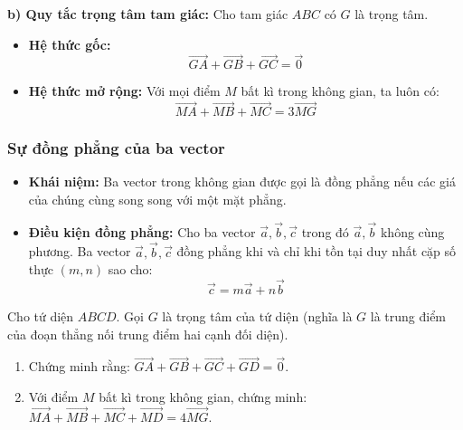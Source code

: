 \documentclass[12pt]{article}
\begin{document}
	
	\noindent \textbf{b) Quy tắc trọng tâm tam giác:}
	Cho tam giác $ABC$ có $G$ là trọng tâm.
	\begin{itemize}
		\item \textbf{Hệ thức gốc:}
		$$ \overrightarrow{GA} + \overrightarrow{GB} + \overrightarrow{GC} = \vec{0} $$
		\item \textbf{Hệ thức mở rộng:} Với mọi điểm $M$ bất kì trong không gian, ta luôn có:
		$$ \overrightarrow{MA} + \overrightarrow{MB} + \overrightarrow{MC} = 3\overrightarrow{MG} $$
	\end{itemize}
	
	\subsubsection{Sự đồng phẳng của ba vector}
	\begin{itemize}
		\item \textbf{Khái niệm:} Ba vector trong không gian được gọi là đồng phẳng nếu các giá của chúng cùng song song với một mặt phẳng.
		\item \textbf{Điều kiện đồng phẳng:} Cho ba vector $\vec{a}, \vec{b}, \vec{c}$ trong đó $\vec{a}, \vec{b}$ không cùng phương. Ba vector $\vec{a}, \vec{b}, \vec{c}$ đồng phẳng khi và chỉ khi tồn tại duy nhất cặp số thực $(m, n)$ sao cho:
		$$ \vec{c} = m\vec{a} + n\vec{b} $$
	\end{itemize}
	
	\begin{vidu}[3]
		Cho tứ diện $ABCD$. Gọi $G$ là trọng tâm của tứ diện (nghĩa là $G$ là trung điểm của đoạn thẳng nối trung điểm hai cạnh đối diện). 
		\begin{enumerate}[label=\alph*)]
			\item Chứng minh rằng: $\overrightarrow{GA} + \overrightarrow{GB} + \overrightarrow{GC} + \overrightarrow{GD} = \vec{0}$.
			\item Với điểm $M$ bất kì trong không gian, chứng minh: $\overrightarrow{MA} + \overrightarrow{MB} + \overrightarrow{MC} + \overrightarrow{MD} = 4\overrightarrow{MG}$.
		\end{enumerate}
	\end{vidu}
	
\end{document}
